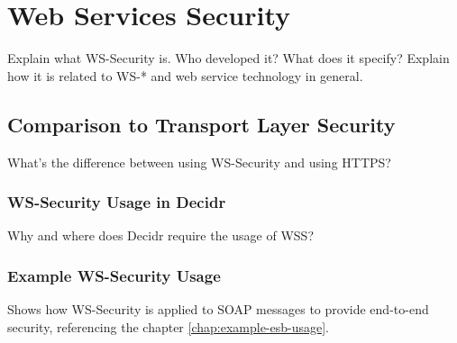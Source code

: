 \chapter{Web Services Security}
\label{chap:web-services-security}
Explain what WS-Security is. Who developed it? What does it
specify? Explain how it is related to WS-* and web service
technology in general.

\section{Comparison to Transport Layer Security}
\label{sec:comparison-to-transport-layer-securtiy}
What's the difference between using WS-Security and using HTTPS?

\subsection{WS-Security Usage in Decidr}
\label{subsec:ws-security-usage-in-decidr}
Why and where does Decidr require the usage of WSS?

\subsection{Example WS-Security Usage}
\label{subsec:example-ws-security-usage}
Shows how WS-Security is applied to SOAP messages to provide end-to-end
security, referencing the chapter \ref{chap:example-esb-usage}. 
